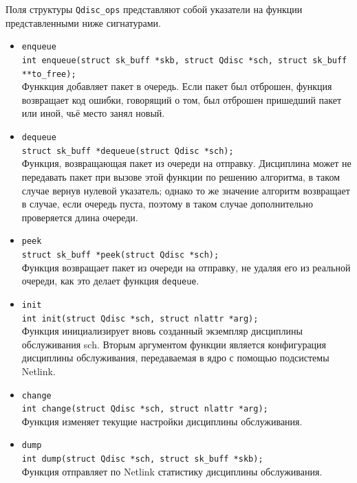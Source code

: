 	Поля структуры \lstinline{Qdisc_ops} представляют собой указатели на функции 
	представленными ниже сигнатурами.
	\begin{itemize}
		\item \lstinline{enqueue}\\
   		    \lstinline{int enqueue(struct sk_buff *skb, struct Qdisc *sch, struct sk_buff **to_free);} \\
			Функкция добавляет пакет в очередь. Если пакет был отброшен, функция
			возвращает код ошибки, говорящий о том, был отброшен пришедший пакет или
			иной, чьё место занял новый.
		\item \lstinline{dequeue}\\
			\lstinline{struct sk_buff *dequeue(struct Qdisc *sch);} \\
			Функция, возвращающая пакет из очереди на отправку. Дисциплина
			может не передавать пакет при вызове этой функции по решению
			алгоритма, в таком случае вернув нулевой указатель; 
			однако то же значение алгоритм возвращает в случае, если очередь
			пуста, поэтому в таком случае дополнительно проверяется длина
			очереди.
		\item \lstinline{peek}\\
			\lstinline{struct sk_buff *peek(struct Qdisc *sch);}\\
			Функция возвращает пакет из очереди на отправку, не удаляя его из реальной очереди,
			как это делает функция \lstinline{dequeue}.
		\item \lstinline{init}\\
			  \lstinline{int init(struct Qdisc *sch, struct nlattr *arg);}\\
			  Функция инициализирует вновь созданный экземпляр дисциплины обслуживания {sch}.
			  Вторым аргументом функции является конфигурация дисциплины обслуживания, передаваемая
			  в ядро с помощью подсистемы Netlink.
		\item \lstinline{change}\\
			  \lstinline{int change(struct Qdisc *sch, struct nlattr *arg);}\\
			  Функция изменяет текущие настройки дисциплины обслуживания. 
		\item \lstinline{dump}\\
			  \lstinline{int dump(struct Qdisc *sch, struct sk_buff *skb);}\\
			  Функция отправляет по Netlink статистику дисциплины обслуживания.
	\end{itemize}

